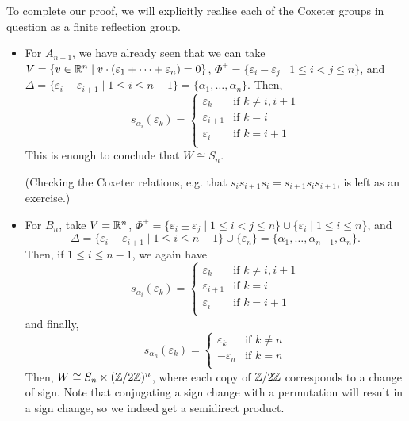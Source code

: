 To complete our proof, we will explicitly realise each of the Coxeter groups in
question as a finite reflection group.

\begin{itemize}
\item
For $A_{n-1}$, we have already seen that we can take
$V = \{v \in \mathbb{R}^n \mid v \cdot (\varepsilon_1 + \dots + \varepsilon_n) = 0\}$,
$\Phi^+ = \{\varepsilon_i - \varepsilon_j \mid 1 \leq i < j \leq n \}$, and
$\Delta = \{\varepsilon_i - \varepsilon_{i+1} \mid 1 \leq i \leq n-1 \}
= \{\alpha_1, \dots, \alpha_n\}$. Then,
\[
    s_{\alpha_i}(\varepsilon_k) = \begin{cases}
        \varepsilon_k & \text{if } k \neq i, i+1 \\
        \varepsilon_{i+1} & \text{if } k = i \\
        \varepsilon_{i} & \text{if } k = i+1 \\
    \end{cases}
\]
This is enough to conclude that $W \cong S_n$.

(Checking the Coxeter relations, e.g. that $s_{i} s_{i+1} s_{i} = s_{i+1} s_{i}
s_{i+1}$, is left as an exercise.)

\item
For $B_n$, take
$V = \mathbb{R}^n$, $\Phi^+ = \{\varepsilon_i \pm \varepsilon_j \mid 1 \leq i < j \leq n\}
\cup \{\varepsilon_i \mid 1 \leq i \leq n\}$, and
\[
\Delta = \{\varepsilon_i - \varepsilon_{i+1} \mid 1 \leq i \leq n-1\} \cup
\{\varepsilon_n\} = \{\alpha_1, \dots, \alpha_{n-1}, \alpha_n\}.
\]
Then, if $1 \leq i \leq n-1$, we again have
\[
    s_{\alpha_i}(\varepsilon_k) = \begin{cases}
        \varepsilon_k & \text{if } k \neq i, i+1 \\
        \varepsilon_{i+1} & \text{if } k = i \\
        \varepsilon_{i} & \text{if } k = i+1 \\
    \end{cases}
\]
and finally,
\[
    s_{\alpha_n}(\varepsilon_k) = \begin{cases}
        \varepsilon_k & \text{if } k \neq n \\
        -\varepsilon_n & \text{if } k = n \\
    \end{cases}
\]
Then, $W \cong S_n \ltimes (\mathbb{Z}/2\mathbb{Z})^n$, where each copy of $\mathbb{Z}/2\mathbb{Z}$ corresponds
to a change of sign. Note that conjugating a sign change with a permutation
will result in a sign change, so we indeed get a semidirect product.


\end{itemize}

